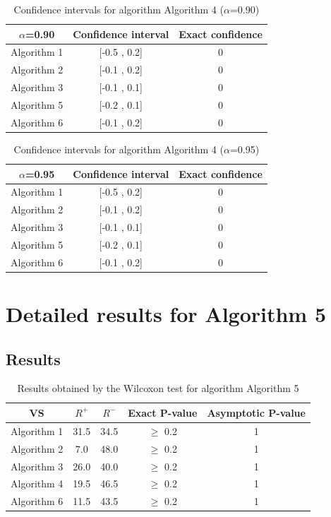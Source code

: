 \documentclass[a4paper,10pt]{article}
\begin{document}
\begin{table}[!htp]
\centering\small
\begin{tabular}{
|c|c|c|}
\hline
 $\alpha$=0.90 & Confidence interval & Exact confidence \\ \hline 
Algorithm 1 & [-0.5 , 0.2] & 0\\ \hline 
Algorithm 2 & [-0.1 , 0.2] & 0\\ \hline 
Algorithm 3 & [-0.1 , 0.1] & 0\\ \hline 
Algorithm 5 & [-0.2 , 0.1] & 0\\ \hline 
Algorithm 6 & [-0.1 , 0.2] & 0\\ \hline 

\end{tabular}
\caption{Confidence intervals for algorithm Algorithm 4 ($\alpha$=0.90)}
\end{table}
\begin{table}[!htp]
\centering\small
\begin{tabular}{
|c|c|c|}
\hline
 $\alpha$=0.95 & Confidence interval & Exact confidence \\ \hline 
Algorithm 1 & [-0.5 , 0.2] & 0\\ \hline 
Algorithm 2 & [-0.1 , 0.2] & 0\\ \hline 
Algorithm 3 & [-0.1 , 0.1] & 0\\ \hline 
Algorithm 5 & [-0.2 , 0.1] & 0\\ \hline 
Algorithm 6 & [-0.1 , 0.2] & 0\\ \hline 

\end{tabular}
\caption{Confidence intervals for algorithm Algorithm 4 ($\alpha$=0.95)}
\end{table}

 \clearpage 


\section{Detailed results for Algorithm 5}


\subsection{Results}

\begin{table}[!htp]
\centering\small
\begin{tabular}{
|c|c|c|c|c|}
\hline
 VS & $R^{+}$ & $R^{-}$ & Exact P-value & Asymptotic P-value \\ \hline 
Algorithm 1 & 31.5 & 34.5 & $\geq$ 0.2 & 1\\ \hline 
Algorithm 2 & 7.0 & 48.0 & $\geq$ 0.2 & 1\\ \hline 
Algorithm 3 & 26.0 & 40.0 & $\geq$ 0.2 & 1\\ \hline 
Algorithm 4 & 19.5 & 46.5 & $\geq$ 0.2 & 1\\ \hline 
Algorithm 6 & 11.5 & 43.5 & $\geq$ 0.2 & 1\\ \hline 

\end{tabular}
\caption{Results obtained by the Wilcoxon test for algorithm Algorithm 5}
\end{table}
\end{document}
